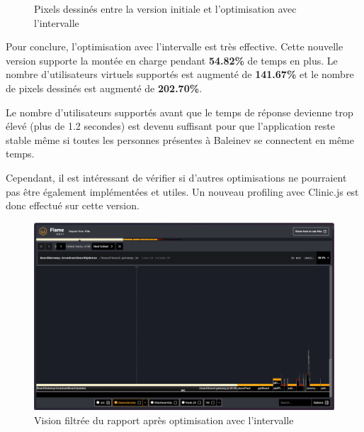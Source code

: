 \begin{figure}[H]
  \centering
  \caption{Pixels dessinés entre la version initiale et l'optimisation avec l'intervalle}
  \label{fig:chart-opti-initial-interval-pixels}
\end{figure}

Pour conclure, l'optimisation avec l'intervalle est très effective. Cette nouvelle version supporte la montée en charge pendant \textbf{54.82\%} de temps en plus. Le nombre d'utilisateurs virtuels supportés est augmenté de \textbf{141.67\%} et le nombre de pixels dessinés est augmenté de \textbf{202.70\%}.

Le nombre d'utilisateurs supportés avant que le temps de réponse devienne trop élevé (plus de 1.2 secondes) est devenu suffisant pour que l'application reste stable même si toutes les personnes présentes à Baleinev se connectent en même temps.

Cependant, il est intéressant de vérifier si d'autres optimisations ne pourraient pas être également implémentées et utiles. Un nouveau profiling avec Clinic.js est donc effectué sur cette version.


\begin{figure}[H]
  \centering
  \includegraphics[width=1\textwidth]{./assets/figures/flame/flame2-filtered.png}
  \caption{Vision filtrée du rapport après optimisation avec l'intervalle}
  \label{fig:flame2-filtered}
\end{figure}

